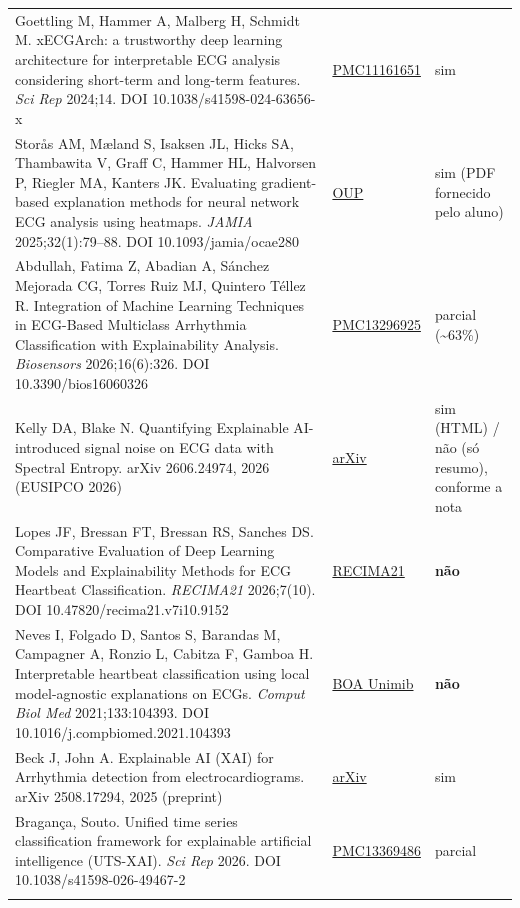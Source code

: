 \documentclass[11pt,a4paper]{article}
\begin{document}
{\begin{xltabular}{\linewidth}{>{\raggedright\arraybackslash}X>{\raggedright\arraybackslash}X>{\raggedright\arraybackslash}X}
Goettling M, Hammer A, Malberg H, Schmidt M. xECGArch: a trustworthy deep learning architecture for interpretable ECG analysis considering short-term and long-term features. \textit{Sci Rep} 2024;14. DOI 10.1038/s41598-024-63656-x & \href{https://pmc.ncbi.nlm.nih.gov/articles/PMC11161651/}{PMC11161651} & sim \\ \addlinespace[1pt]
Storås AM, Mæland S, Isaksen JL, Hicks SA, Thambawita V, Graff C, Hammer HL, Halvorsen P, Riegler MA, Kanters JK. Evaluating gradient-based explanation methods for neural network ECG analysis using heatmaps. \textit{JAMIA} 2025;32(1):79–88. DOI 10.1093/jamia/ocae280 & \href{https://academic.oup.com/jamia/article/32/1/79/7876016}{OUP} & sim (PDF fornecido pelo aluno) \\ \addlinespace[1pt]
Abdullah, Fatima Z, Abadian A, Sánchez Mejorada CG, Torres Ruiz MJ, Quintero Téllez R. Integration of Machine Learning Techniques in ECG-Based Multiclass Arrhythmia Classification with Explainability Analysis. \textit{Biosensors} 2026;16(6):326. DOI 10.3390/bios16060326 & \href{https://pmc.ncbi.nlm.nih.gov/articles/PMC13296925/}{PMC13296925} & parcial (\textasciitilde{}63\%) \\ \addlinespace[1pt]
Kelly DA, Blake N. Quantifying Explainable AI-introduced signal noise on ECG data with Spectral Entropy. arXiv 2606.24974, 2026 (EUSIPCO 2026) & \href{https://arxiv.org/html/2606.24974}{arXiv} & sim (HTML) / não (só resumo), conforme a nota \\ \addlinespace[1pt]
Lopes JF, Bressan FT, Bressan RS, Sanches DS. Comparative Evaluation of Deep Learning Models and Explainability Methods for ECG Heartbeat Classification. \textit{RECIMA21} 2026;7(10). DOI 10.47820/recima21.v7i10.9152 & \href{https://recima21.com.br/recima21/en/article/view/9152}{RECIMA21} & \textbf{não} \\ \addlinespace[1pt]
Neves I, Folgado D, Santos S, Barandas M, Campagner A, Ronzio L, Cabitza F, Gamboa H. Interpretable heartbeat classification using local model-agnostic explanations on ECGs. \textit{Comput Biol Med} 2021;133:104393. DOI 10.1016/j.compbiomed.2021.104393 & \href{https://boa.unimib.it/handle/10281/324847}{BOA Unimib} & \textbf{não} \\ \addlinespace[1pt]
Beck J, John A. Explainable AI (XAI) for Arrhythmia detection from electrocardiograms. arXiv 2508.17294, 2025 (preprint) & \href{https://arxiv.org/html/2508.17294v1}{arXiv} & sim \\ \addlinespace[1pt]
Bragança, Souto. Unified time series classification framework for explainable artificial intelligence (UTS-XAI). \textit{Sci Rep} 2026. DOI 10.1038/s41598-026-49467-2 & \href{https://pmc.ncbi.nlm.nih.gov/articles/PMC13369486/}{PMC13369486} & parcial \\ \addlinespace[1pt]

\end{xltabular}}
\end{document}
